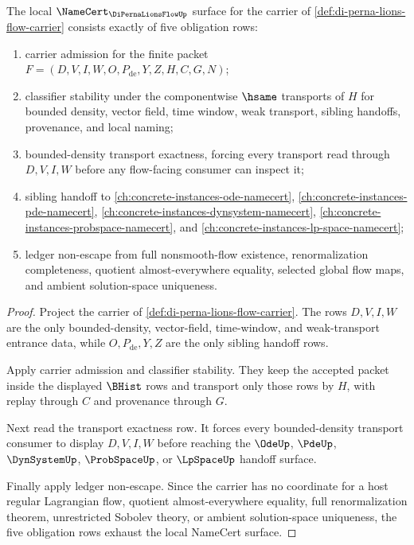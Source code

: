 \begin{theorem}
\label{thm:di-perna-lions-flow-namecert-obligations}
The local $\NameCert_{\DiPernaLionsFlowUp}$ surface for the carrier of \autoref{def:di-perna-lions-flow-carrier} consists exactly of five obligation rows:
\begin{enumerate}
\item carrier admission for the finite packet $F=(D,V,I,W,O,P_{\mathrm{de}},Y,Z,H,C,G,N)$;
\item classifier stability under the componentwise $\hsame$ transports of $H$ for bounded density, vector field, time window, weak transport, sibling handoffs, provenance, and local naming;
\item bounded-density transport exactness, forcing every transport read through $D,V,I,W$ before any flow-facing consumer can inspect it;
\item sibling handoff to \autoref{ch:concrete-instances-ode-namecert}, \autoref{ch:concrete-instances-pde-namecert}, \autoref{ch:concrete-instances-dynsystem-namecert}, \autoref{ch:concrete-instances-probspace-namecert}, and \autoref{ch:concrete-instances-lp-space-namecert};
\item ledger non-escape from full nonsmooth-flow existence, renormalization completeness, quotient almost-everywhere equality, selected global flow maps, and ambient solution-space uniqueness.
\end{enumerate}
\end{theorem}
\begin{proof}
Project the carrier of \autoref{def:di-perna-lions-flow-carrier}. The rows $D,V,I,W$ are the only bounded-density, vector-field, time-window, and weak-transport entrance data, while $O,P_{\mathrm{de}},Y,Z$ are the only sibling handoff rows.

Apply carrier admission and classifier stability. They keep the accepted packet inside the displayed $\BHist$ rows and transport only those rows by $H$, with replay through $C$ and provenance through $G$.

Next read the transport exactness row. It forces every bounded-density transport consumer to display $D,V,I,W$ before reaching the $\OdeUp$, $\PdeUp$, $\DynSystemUp$, $\ProbSpaceUp$, or $\LpSpaceUp$ handoff surface.

Finally apply ledger non-escape. Since the carrier has no coordinate for a host regular Lagrangian flow, quotient almost-everywhere equality, full renormalization theorem, unrestricted Sobolev theory, or ambient solution-space uniqueness, the five obligation rows exhaust the local NameCert surface.
\end{proof}

